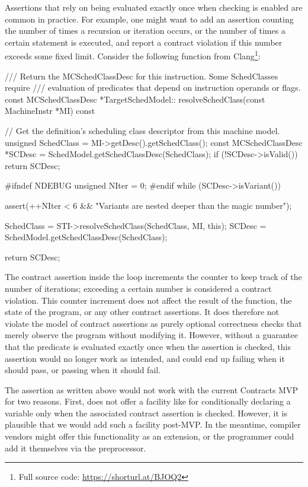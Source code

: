 Assertions that rely on being evaluated exactly once when checking is enabled are common in practice. For example, one might want to add an assertion counting the number of times a recursion or iteration occurs, or the number of times a certain statement is executed, and report a contract violation if this number exceeds some fixed limit. Consider the following function from Clang\footnote{Full source code: \url{https://shorturl.at/BJOQ2}}:
\begin{codeblock}
/// Return the MCSchedClassDesc for this instruction. Some SchedClasses require
/// evaluation of predicates that depend on instruction operands or flags.
const MCSchedClassDesc *TargetSchedModel::
resolveSchedClass(const MachineInstr *MI) const {

  // Get the definition's scheduling class descriptor from this machine model.
  unsigned SchedClass = MI->getDesc().getSchedClass();
  const MCSchedClassDesc *SCDesc = SchedModel.getSchedClassDesc(SchedClass);
  if (!SCDesc->isValid())
    return SCDesc;

#ifndef NDEBUG
  unsigned NIter = 0;
#endif
  while (SCDesc->isVariant()) {
    assert(++NIter < 6 && "Variants are nested deeper than the magic number");

    SchedClass = STI->resolveSchedClass(SchedClass, MI, this);
    SCDesc = SchedModel.getSchedClassDesc(SchedClass);
  }
  return SCDesc;
}
\end{codeblock}
The contract assertion inside the  loop increments the counter  to keep track of the number of iterations; exceeding a certain number is considered a contract violation. This counter increment does not affect the result of the function, the state of the program, or any other contract assertions. It does therefore not violate the model of contract assertions as purely optional correctness checks that merely observe the program without modifying it. However, without a guarantee that the predicate is evaluated exactly once when the assertion is checked, this assertion would no longer work as intended, and could end up failing when it should pass, or passing when it should fail.

The assertion as written above would not work with the current Contracts MVP for two reasons. First, \cite{P2900R6} does not offer a facility like  for conditionally declaring a variable only when the associated contract assertion is checked. However, it is plausible that we would add such a facility post-MVP. In the meantime, compiler vendors might offer this functionality as an extension, or the programmer could add it themselves via the preprocessor.

